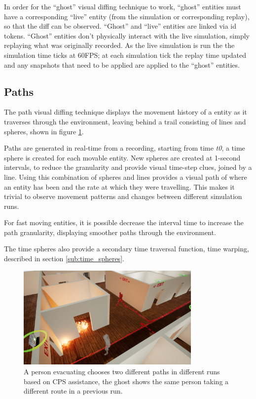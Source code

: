 In order for the ``ghost'' visual diffing technique to work, ``ghost'' entities must have a corresponding ``live'' entity (from the simulation or corresponding replay), so that the diff can be observed. ``Ghost'' and ``live'' entities are linked via id tokens. ``Ghost'' entities don't physically interact with the live simulation, simply replaying what was originally recorded. As the live simulation is run the the simulation time ticks at 60FPS; at each simulation tick the replay time updated and any snapshots that need to be applied are applied to the ``ghost'' entities.



\subsection{Paths} %
\label{sub:paths}
The path visual diffing technique displays the movement history of a entity as it traverses through the environment, leaving behind a trail consisting of lines and spheres, shown in figure \ref{fig:path_navigation_diff}.

Paths are generated in real-time from a recording, starting from time \textit{t0}, a time sphere is created for each movable entity. New spheres are created at 1-second intervals, to reduce the granularity and provide visual time-step clues, joined by a line. Using this combination of spheres and lines provides a visual path of where an entity has been and the rate at which they were travelling. This makes it trivial to observe movement patterns and changes between different simulation runs.

For fast moving entities, it is possible decrease the interval time to increase the path granularity, displaying smoother paths through the environment.

The time spheres also provide a secondary time traversal function, time warping, described in section \ref{sub:time_spheres}.

\begin{figure}[h]
	\centering
	\includegraphics[width=0.8\textwidth]{img/fireevacghost.png}
	\caption{A person evacuating chooses two different paths in different runs based on CPS assistance, the ghost shows the same person taking a different route in a previous run.}
	\label{fig:path_navigation_diff}
\end{figure}

